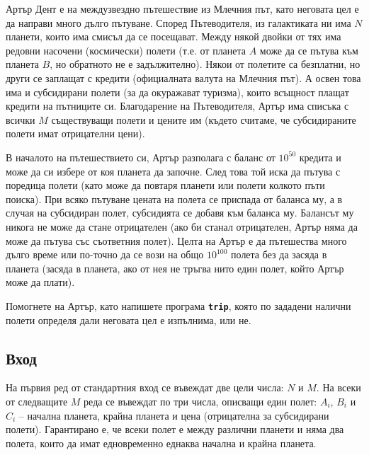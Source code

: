 \documentclass[12pt]{article}
\begin{document}
\renewcommand{\tl}{$1.6$ сек.}
\renewcommand{\ml}{$1024$ MB}
\renewcommand{\header}{
	XLII НАЦИОНАЛНА ОЛИМПИАДА ПО ИНФОРМАТИКА\\
	Областен кръг, 14 февруари 2026 г.\\
	Група A – 11, 12 клас
}

Артър Дент е на междузвездно пътешествие из Млечния път, като неговата цел е да направи много дълго пътуване. Според Пътеводителя, из галактиката ни има $N$ планети, които има смисъл да се посещават. Между някой двойки от тях има редовни насочени (космически) полети (т.е. от планета $A$ може да се пътува към планета $B$, но обратното не е задължително). Някои от полетите са безплатни, но други се заплащат с кредити (официалната валута на Млечния път). А освен това има и субсидирани полети (за да окуражават туризма), които всъщност плащат кредити на пътниците си. Благодарение на Пътеводителя, Артър има списъка с всички $M$ съществуващи полети и цените им (където считаме, че субсидираните полети имат отрицателни цени).

В началото на пътешествието си, Артър разполага с баланс от $10^{50}$ кредита и може да си избере от коя планета да започне. След това той иска да пътува с поредица полети (като може да повтаря планети или полети колкото пъти поиска). При всяко пътуване цената на полета се приспада от баланса му, а в случая на субсидиран полет, субсидията се добавя към баланса му. Балансът му никога не може да стане отрицателен (ако би станал отрицателен, Артър няма да може да пътува със съответния полет). Целта на Артър е да пътешества много дълго време или по-точно да се вози на общо $10^{100}$ полета без да засяда в планета (засяда в планета, ако от нея не тръгва нито един полет, който Артър може да плати).

Помогнете на Артър, като напишете програма \textbf{\texttt{trip}}, която по зададени налични полети определя дали неговата цел е изпълнима, или не.

\subsection{Вход}

На първия ред от стандартния вход се въвеждат две цели числа: $N$ и $M$. На всеки от следващите $M$ реда се въвеждат по три числа, описващи един полет: $A_i$, $B_i$ и $C_i$ -- начална планета, крайна планета и цена (отрицателна за субсидирани полети). Гарантирано е, че всеки полет е между различни планети и няма два полета, които да имат едновременно еднаква начална и крайна планета.
\end{document}
